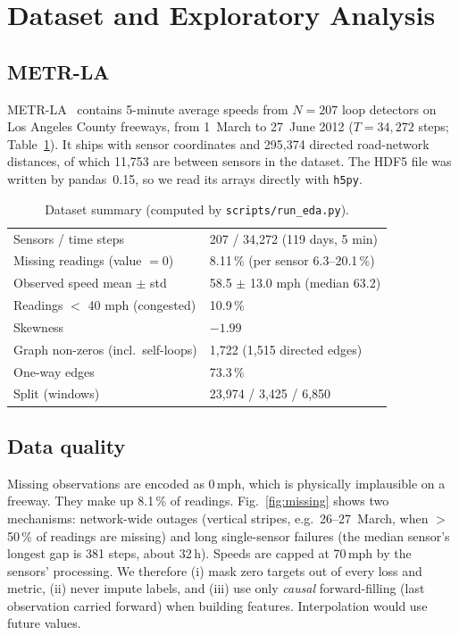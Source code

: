 \section{Dataset and Exploratory Analysis}
\label{sec:data}

\subsection{METR-LA}
METR-LA~\cite{jagadish2014,li2018dcrnn} contains 5-minute average speeds from
$N{=}207$ loop detectors on Los Angeles County freeways, from 1~March to 27~June
2012 ($T{=}34{,}272$ steps; Table~\ref{tab:data}). It ships with sensor
coordinates and 295,374 directed road-network distances, of which 11,753 are
between sensors in the dataset. The HDF5 file was written by pandas~0.15, so we
read its arrays directly with \texttt{h5py}.

\begin{table}[t]
\centering
\caption{Dataset summary (computed by \texttt{scripts/run\_eda.py}).}
\label{tab:data}
\begin{tabular}{ll}
\toprule
Sensors / time steps & 207 / 34,272 (119 days, 5 min) \\
Missing readings (value $=0$) & 8.11\,\% (per sensor 6.3--20.1\,\%) \\
Observed speed mean $\pm$ std & 58.5 $\pm$ 13.0 mph (median 63.2) \\
Readings $<$ 40 mph (congested) & 10.9\,\% \\
Skewness & $-1.99$ \\
Graph non-zeros (incl.\ self-loops) & 1,722 (1,515 directed edges) \\
One-way edges & 73.3\,\% \\
Split (windows) & 23,974 / 3,425 / 6,850 \\
\bottomrule
\end{tabular}
\end{table}

\subsection{Data quality}
Missing observations are encoded as $0$\,mph, which is physically implausible on a
freeway. They make up 8.1\,\% of readings. Fig.~\ref{fig:missing} shows two
mechanisms: network-wide outages (vertical stripes, e.g.\ 26--27~March, when
$>$50\,\% of readings are missing) and long single-sensor failures (the median
sensor's longest gap is 381 steps, about 32\,h). Speeds are capped at 70\,mph by the
sensors' processing. We therefore (i) mask zero targets out of every loss and metric,
(ii) never impute labels, and (iii) use only \emph{causal} forward-filling (last
observation carried forward) when building features. Interpolation would use future
values.

